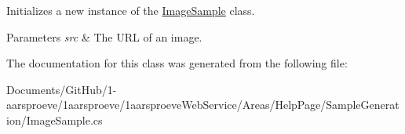 Initializes a new instance of the \hyperlink{class__1aarsproeve_web_service_1_1_areas_1_1_help_page_1_1_image_sample}{Image\+Sample} class. 


\begin{DoxyParams}{Parameters}
{\em src} & The U\+R\+L of an image.\\
\hline
\end{DoxyParams}


The documentation for this class was generated from the following file\+:\begin{DoxyCompactItemize}
\item 
Documents/\+Git\+Hub/1-\/aarsproeve/1aarsproeve/1aarsproeve\+Web\+Service/\+Areas/\+Help\+Page/\+Sample\+Generation/Image\+Sample.\+cs\end{DoxyCompactItemize}
